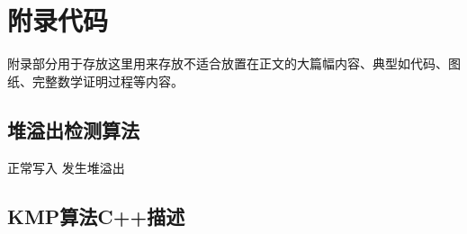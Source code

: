     \chapter{附录代码}

    附录部分用于存放这里用来存放不适合放置在正文的大篇幅内容、典型如代码、图纸、完整数学证明过程等内容。
    
    \section{堆溢出检测算法}
    
    \begin{algorithm}[h]
        \caption{堆溢出检测算法}\label{alg:ovf}
        \begin{algorithmic}[1]
                \STATE 正常写入
                \STATE 发生堆溢出
            \ENDIF
        \end{algorithmic}
    \end{algorithm}
    
    \section{KMP算法C++描述}
    
